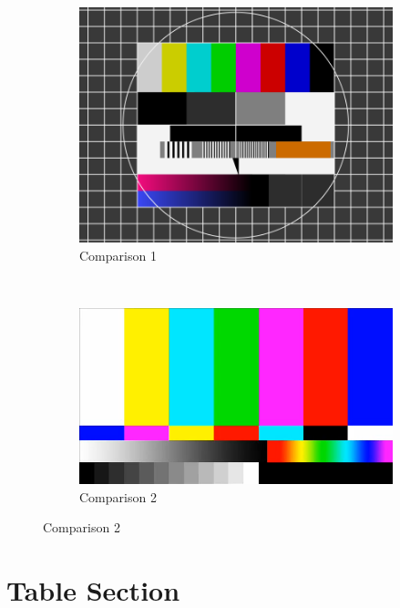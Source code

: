 \begin{figure}[H]
        \centering
        \begin{subfigure}[b]{0.5\textwidth}
                \includegraphics[width=\textwidth]{./Images/test_1.png}
                \caption{\scriptsize Comparison 1}
        \end{subfigure}%
        ~ %
        \begin{subfigure}[b]{0.5\textwidth}
                \includegraphics[width=\textwidth]{./Images/test_2.png}
                \caption{\scriptsize Comparison 2}
        \end{subfigure}
\end{figure}


\section{Table Section}

